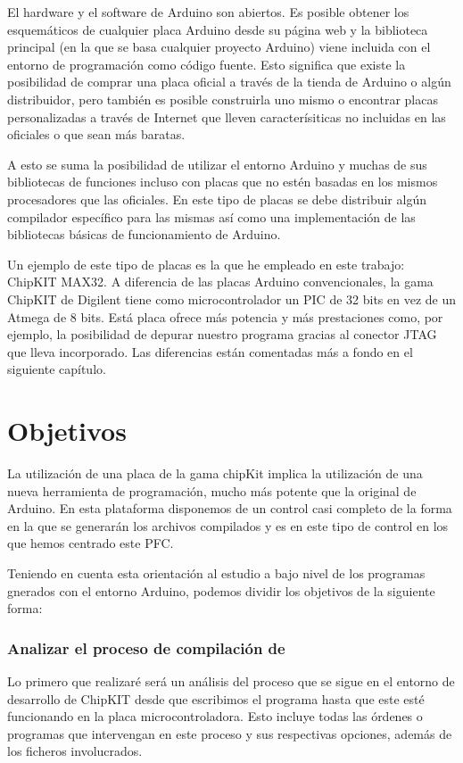 El hardware y el software de Arduino son abiertos.  Es posible obtener los esquemáticos de cualquier placa Arduino desde su página web y la biblioteca principal (en la que se basa cualquier proyecto Arduino) viene incluida con el entorno de programación como código fuente.  Esto significa que existe la posibilidad de comprar una placa oficial a través de la tienda de Arduino o algún distribuidor, pero también es posible construirla uno mismo o encontrar placas personalizadas a través de Internet que lleven caracterísiticas no incluidas en las oficiales o que sean más baratas.

A esto se suma la posibilidad de utilizar el entorno Arduino y muchas de sus bibliotecas de funciones incluso con placas que no estén basadas en los mismos procesadores que las oficiales. En este tipo de placas se debe distribuir algún compilador específico para las mismas así como una implementación de las bibliotecas básicas de funcionamiento de Arduino.

Un ejemplo de este tipo de placas es la que he empleado en este trabajo: ChipKIT MAX32.  A diferencia de las placas Arduino convencionales, la gama ChipKIT de Digilent tiene como microcontrolador un PIC de 32 bits en vez de un Atmega de 8 bits.  Está placa ofrece más potencia y más prestaciones como, por ejemplo, la posibilidad de depurar nuestro programa gracias al conector JTAG que lleva incorporado. Las diferencias están comentadas más a fondo en el siguiente capítulo.

\section{Objetivos}
La utilización de una placa de la gama chipKit implica la utilización de una nueva herramienta de programación, mucho más potente que la original de Arduino. En esta plataforma disponemos de un control casi completo de la forma en la que se generarán los archivos compilados y es en este tipo de control en los que hemos centrado este PFC.\@

Teniendo en cuenta esta orientación al estudio a bajo nivel de los programas gnerados con el entorno Arduino, podemos dividir los objetivos de la siguiente forma:

\subsubsection{Analizar el proceso de compilación de }
Lo primero que realizaré será un análisis del proceso que se sigue en el entorno de desarrollo de ChipKIT desde que escribimos el programa hasta que este esté funcionando en la placa microcontroladora.  Esto incluye todas las órdenes o programas que intervengan en este proceso y sus respectivas opciones, además de los ficheros involucrados.

